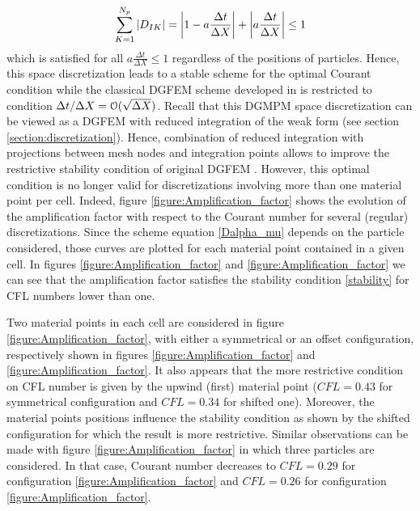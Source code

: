 \begin{equation}
\sum_{K=1}^{N_p} \left\vert D_{IK}\right\vert = \left\vert1 - a\frac{\Delta t}{\Delta X} \right\vert +  \left\vert a\frac{\Delta t}{\Delta X} \right\vert \leq 1 \label{eq:1ppc_stab}
\end{equation}
which is satisfied for all $a\frac{\Delta t}{\Delta X} \leq 1$ regardless of the positions of particles.
Hence, this space discretization leads to a stable scheme for the optimal Courant condition while the classical DGFEM scheme developed in \cite{Chavent_Salzano} is restricted to condition $\Delta t / \Delta X = \mathcal{O}(\sqrt{\Delta X})$. Recall that this DGMPM space discretization can be viewed as a DGFEM with reduced integration of the weak form (see section \ref{section:discretization}). Hence, combination of reduced integration with projections between mesh nodes and integration points allows to improve the restrictive stability condition of original DGFEM \cite{Chavent_Salzano,NeutronDG}. However, this optimal condition is no longer valid for discretizations involving more than one material point per cell. Indeed, figure \ref{figure:Amplification_factor} shows the evolution of the amplification factor with respect to the Courant number for several (regular) discretizations. Since the scheme equation \eqref{Dalpha_mu} depends on the particle considered, those curves are plotted for each material point contained in a given cell. In figures \ref{figure:Amplification_factor} and \ref{figure:Amplification_factor} we can see that the amplification factor satisfies the stability condition \eqref{stability} for CFL numbers lower than one.

Two material points in each cell are considered in figure \ref{figure:Amplification_factor}, with either a symmetrical or an offset configuration, respectively shown in figures \ref{figure:Amplification_factor} and \ref{figure:Amplification_factor}. It also appears that the more restrictive condition on CFL number is given by the upwind (first) material point ($CFL=0.43$ for symmetrical configuration and $CFL=0.34$ for shifted one). Moreover, the material points positions influence the stability condition as shown by the shifted configuration for which the result is more restrictive. Similar observations can be made with figure \ref{figure:Amplification_factor} in which three particles are considered. In that case, Courant number decreases to $CFL=0.29$ for configuration \ref{figure:Amplification_factor} and $CFL=0.26$ for configuration \ref{figure:Amplification_factor}. 

